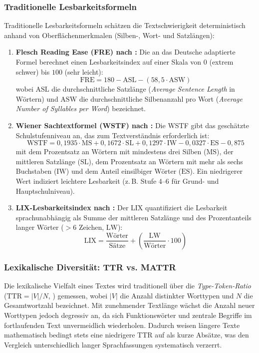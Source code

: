 \subsubsection{Traditionelle Lesbarkeitsformeln}
Traditionelle Lesbarkeitsformeln schätzen die Textschwierigkeit deterministisch anhand von Oberflächenmerkmalen (Silben-, Wort- und Satzlängen):
\begin{enumerate}
    \item \textbf{Flesch Reading Ease (FRE) nach \citet{amstad1978verstaendlich}:} Die an das Deutsche adaptierte Formel berechnet einen Lesbarkeitsindex auf einer Skala von $0$ (extrem schwer) bis $100$ (sehr leicht):
    \begin{equation}
        \text{FRE} = 180 - \text{ASL} - (58{,}5 \cdot \text{ASW})
    \end{equation}
    wobei $\text{ASL}$ die durchschnittliche Satzlänge (\textit{Average Sentence Length} in Wörtern) und $\text{ASW}$ die durchschnittliche Silbenanzahl pro Wort (\textit{Average Number of Syllables per Word}) bezeichnet.
    \item \textbf{Wiener Sachtextformel (WSTF) nach \citet{bamberger1984lesen}:} Die WSTF gibt das geschätzte Schulstufenniveau an, das zum Textverständnis erforderlich ist:
    \begin{equation}
        \text{WSTF} = 0{,}1935 \cdot \text{MS} + 0{,}1672 \cdot \text{SL} + 0{,}1297 \cdot \text{IW} - 0{,}0327 \cdot \text{ES} - 0{,}875
    \end{equation}
    mit dem Prozentsatz an Wörtern mit mindestens drei Silben ($\text{MS}$), der mittleren Satzlänge ($\text{SL}$), dem Prozentsatz an Wörtern mit mehr als sechs Buchstaben ($\text{IW}$) und dem Anteil einsilbiger Wörter ($\text{ES}$). Ein niedrigerer Wert indiziert leichtere Lesbarkeit (z.\,B. Stufe 4--6 für Grund- und Hauptschulniveau).
    \item \textbf{LIX-Lesbarkeitsindex nach \citet{bjornsson1968readability}:} Der LIX quantifiziert die Lesbarkeit sprachunabhängig als Summe der mittleren Satzlänge und des Prozentanteils langer Wörter ($> 6$ Zeichen, $\text{LW}$):
    \begin{equation}
        \text{LIX} = \frac{\text{Wörter}}{\text{Sätze}} + \left( \frac{\text{LW}}{\text{Wörter}} \cdot 100 \right)
    \end{equation}
\end{enumerate}

\subsubsection{Lexikalische Diversität: TTR vs. MATTR}
Die lexikalische Vielfalt eines Textes wird traditionell über die \textit{Type-Token-Ratio} ($\text{TTR} = |V| / N$, \citealp{chotlos1944studies, templin1957certain}) gemessen, wobei $|V|$ die Anzahl distinkter Worttypen und $N$ die Gesamtwortzahl bezeichnet. Mit zunehmender Textlänge wächst die Anzahl neuer Worttypen jedoch degressiv an, da sich Funktionswörter und zentrale Begriffe im fortlaufenden Text unvermeidlich wiederholen. Dadurch weisen längere Texte mathematisch bedingt stets eine niedrigere TTR auf als kurze Absätze, was den Vergleich unterschiedlich langer Sprachfassungen systematisch verzerrt.

